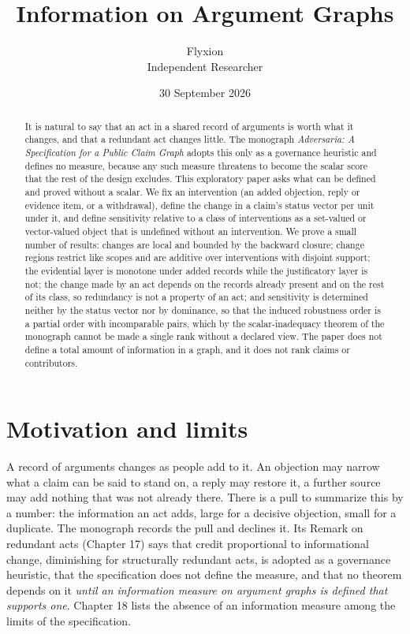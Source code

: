 \documentclass[11pt]{article}
\title{Information on Argument Graphs}
\author{Flyxion\\\small Independent Researcher}
\date{30 September 2026}
\theoremstyle{plain}
\theoremstyle{definition}
\theoremstyle{remark}
\begin{document}
\maketitle

\begin{abstract}
\noindent
It is natural to say that an act in a shared record of arguments is worth what it changes, and that a redundant act changes little. The monograph \emph{Adversaria: A Specification for a Public Claim Graph} adopts this only as a governance heuristic and defines no measure, because any such measure threatens to become the scalar score that the rest of the design excludes. This exploratory paper asks what can be defined and proved without a scalar. We fix an intervention (an added objection, reply or evidence item, or a withdrawal), define the change in a claim's status vector per unit under it, and define sensitivity relative to a class of interventions as a set-valued or vector-valued object that is undefined without an intervention. We prove a small number of results: changes are local and bounded by the backward closure; change regions restrict like scopes and are additive over interventions with disjoint support; the evidential layer is monotone under added records while the justificatory layer is not; the change made by an act depends on the records already present and on the rest of its class, so redundancy is not a property of an act; and sensitivity is determined neither by the status vector nor by dominance, so that the induced robustness order is a partial order with incomparable pairs, which by the scalar-inadequacy theorem of the monograph cannot be made a single rank without a declared view. The paper does not define a total amount of information in a graph, and it does not rank claims or contributors.
\end{abstract}

\section{Motivation and limits}\label{sec:motivation}

A record of arguments changes as people add to it. An objection may narrow what a claim can be said to stand on, a reply may restore it, a further source may add nothing that was not already there. There is a pull to summarize this by a number: the information an act adds, large for a decisive objection, small for a duplicate. The monograph records the pull and declines it. Its Remark on redundant acts (Chapter 17) says that credit proportional to informational change, diminishing for structurally redundant acts, is adopted as a governance heuristic, that the specification does not define the measure, and that no theorem depends on it \emph{until an information measure on argument graphs is defined that supports one}. Chapter 18 lists the absence of an information measure among the limits of the specification.
\end{document}
